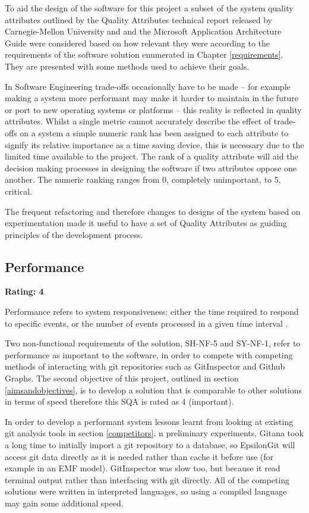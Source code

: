\documentclass[11pt]{book}
\begin{document}
To aid the design of the software for this project a subset of the system quality attributes outlined by the Quality Attributes technical report released by Carnegie-Mellon University and and the Microsoft Application Architecture Guide \cite{qualitymicrosoft} were considered based on how relevant they were according to the requirements of the software solution enumerated in Chapter \ref{requirements}. They are presented with some methods used to achieve their goals.

In Software Engineering trade-offs occasionally have to be made -- for example making a system more performant may make it harder to maintain in the future or port to new operating systems or platforms -- this reality is reflected in quality attributes. Whilst a single metric cannot accurately describe the effect of trade-offs on a system a simple numeric rank has been assigned to each attribute to signify its relative importance as a time saving device, this is necessary due to the limited time available to the project. The rank of a quality attribute will aid the decision making processes in designing the software if two attributes oppose one another. The numeric ranking ranges from 0, completely unimportant, to 5, critical.

The frequent refactoring and therefore changes to designs of the system based on experimentation made it useful to have a set of Quality Attributes as guiding principles of the development process.

\subsection{Performance}
\textbf{Rating: 4}

Performance refers to system responsiveness: either the time required to respond to specific events, or the number of events processed in a given time interval \cite{performancedefinition}.

Two non-functional requirements of the solution, SH-NF-5 and SY-NF-1, refer to performance as important to the software, in order to compete with competing methods of interacting with git repositories such as GitInspector and Github Graphs. The second objective of this project, outlined in section \ref{aimsandobjectives}, is to develop a solution that is comparable to other solutions in terms of speed therefore this SQA is rated as 4 (important).

In order to develop a performant system lessons learnt from looking at existing git analysis tools in section \ref{competitors}. n preliminary experiments, Gitana took a long time to initially import a git repository to a database, so EpsilonGit will access git data directly as it is needed rather than cache it before use (for example in an EMF model). GitInspector was slow too, but because it read terminal output rather than interfacing with git directly. All of the competing solutions were written in interpreted languages, so using a compiled language may gain some additional speed.
\end{document}

